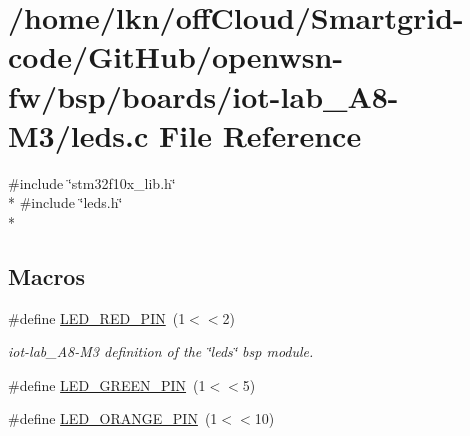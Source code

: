 \hypertarget{iot-lab___a8-_m3_2leds_8c}{}\section{/home/lkn/off\+Cloud/\+Smartgrid-\/code/\+Git\+Hub/openwsn-\/fw/bsp/boards/iot-\/lab\+\_\+\+A8-\/\+M3/leds.c File Reference}
\label{iot-lab___a8-_m3_2leds_8c}
{\ttfamily \#include \char`\"{}stm32f10x\+\_\+lib.\+h\char`\"{}}\\*
{\ttfamily \#include \char`\"{}leds.\+h\char`\"{}}\\*
\subsection*{Macros}
\begin{DoxyCompactItemize}
\item 
\#define \hyperlink{iot-lab___a8-_m3_2leds_8c_ab9824ab080c30006c1baaa0dd7e863c5}{L\+E\+D\+\_\+\+R\+E\+D\+\_\+\+P\+IN}~(1$<$$<$2)
\begin{DoxyCompactList}\small\item\em iot-\/lab\+\_\+\+A8-\/\+M3 definition of the \char`\"{}leds\char`\"{} bsp module. \end{DoxyCompactList}\item 
\#define \hyperlink{iot-lab___a8-_m3_2leds_8c_a0539be032702009fb24beec89c6fa0c0}{L\+E\+D\+\_\+\+G\+R\+E\+E\+N\+\_\+\+P\+IN}~(1$<$$<$5)
\item 
\#define \hyperlink{iot-lab___a8-_m3_2leds_8c_aea00e65d8db15efe130e134943eec5a7}{L\+E\+D\+\_\+\+O\+R\+A\+N\+G\+E\+\_\+\+P\+IN}~(1$<$$<$10)
\end{DoxyCompactItemize}
